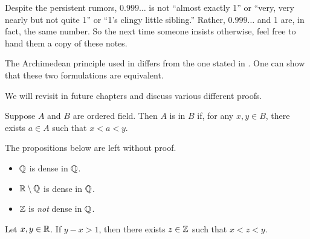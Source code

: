 \documentclass[11pt,twoside=off,numbers=noenddot]{scrbook}
\begin{document}
\begin{remark}
  Despite the persistent rumors, $0.999\ldots$ is not
  ``almost exactly 1'' or ``very, very nearly but not quite 1'' or
  ``1's clingy little sibling.'' Rather, $0.999\ldots$ and 1 are, in
  fact, the same number. So the next time someone insists otherwise,
  feel free to hand them a copy of these notes.
\end{remark}

\begin{remark}
  The Archimedean principle used in  differs from
  the one stated in . One can show that
  these two formulations are equivalent.
\end{remark}

\begin{remark}
  We will revisit  in future chapters and discuss
  various different proofs.
\end{remark}

\begin{definition}[Density]
  Suppose $A$ and $B$ are ordered field. Then $A$ is  in
  $B$ if, for any $x, y \in B$, there exists $a \in A$ such that $x < a < y$.
\end{definition}

\begin{example}
  The propositions below are left without proof.
  \begin{itemize}
    \item $\mathbb Q$ is dense in $\mathbb Q$.
    \item $\mathbb R \setminus \mathbb Q$ is dense in $\mathbb Q$.
    \item $\mathbb Z$ is \textit{not} dense in $\mathbb Q$.
  \end{itemize}
\end{example}

\begin{lemma}
  Let $x, y \in \mathbb R$. If $y - x > 1$, then there exists $z \in \mathbb Z$
  such that $x < z < y$.
\end{lemma}
\end{document}
